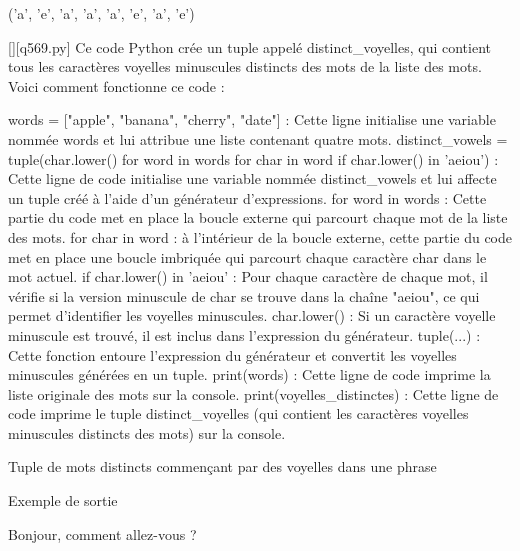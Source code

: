 ('a', 'e', 'a', 'a', 'a', 'e', 'a', 'e')
        \par
        \begin{solution}
            \renewcommand{\nomfichier}{q569.py}
            \pythonfile{\chemincode \nomfichier}[][\nomfichier]
            Ce code Python crée un tuple appelé distinct_voyelles, qui contient tous les caractères voyelles minuscules distincts des mots de la liste des mots. Voici comment fonctionne ce code :

    words = ["apple", "banana", "cherry", "date"] : Cette ligne initialise une variable nommée words et lui attribue une liste contenant quatre mots.
    distinct_vowels = tuple(char.lower() for word in words for char in word if char.lower() in 'aeiou') : Cette ligne de code initialise une variable nommée distinct_vowels et lui affecte un tuple créé à l'aide d'un générateur d'expressions.
        for word in words : Cette partie du code met en place la boucle externe qui parcourt chaque mot de la liste des mots.
        for char in word : à l'intérieur de la boucle externe, cette partie du code met en place une boucle imbriquée qui parcourt chaque caractère char dans le mot actuel.
        if char.lower() in 'aeiou' : Pour chaque caractère de chaque mot, il vérifie si la version minuscule de char se trouve dans la chaîne "aeiou", ce qui permet d'identifier les voyelles minuscules.
        char.lower() : Si un caractère voyelle minuscule est trouvé, il est inclus dans l'expression du générateur.
        tuple(...) : Cette fonction entoure l'expression du générateur et convertit les voyelles minuscules générées en un tuple.
    print(words) : Cette ligne de code imprime la liste originale des mots sur la console.
    print(voyelles_distinctes) : Cette ligne de code imprime le tuple distinct_voyelles (qui contient les caractères voyelles minuscules distincts des mots) sur la console.
        \end{solution}
        

        \question
        Tuple de mots distincts commençant par des voyelles dans une phrase

Exemple de sortie

Bonjour, comment allez-vous ?

